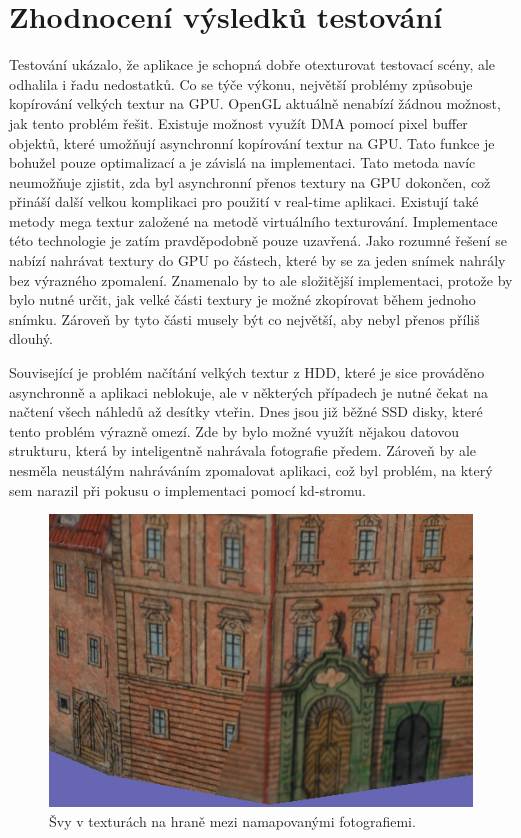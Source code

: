 \documentclass[11pt,twoside,a4paper]{book}
\begin{document}
\section{Zhodnocení výsledků testování}

Testování ukázalo, že aplikace je schopná dobře otexturovat testovací scény, ale odhalila i řadu nedostatků. Co se týče výkonu, největší problémy způsobuje kopírování velkých textur na GPU. OpenGL aktuálně nenabízí žádnou možnost, jak tento problém řešit. Existuje možnost využít DMA pomocí pixel buffer objektů, které umožňují asynchronní kopírování textur na GPU. Tato funkce je bohužel pouze optimalizací a je závislá na implementaci. Tato metoda navíc neumožňuje zjistit, zda byl asynchronní přenos textury na GPU dokončen, což přináší další velkou komplikaci pro použití v real-time aplikaci. Existují také metody mega textur \cite{mega} založené na metodě virtuálního texturování. Implementace této technologie je zatím pravděpodobně pouze uzavřená. Jako rozumné řešení se nabízí nahrávat textury do GPU po částech, které by se za jeden snímek nahrály bez výrazného zpomalení. Znamenalo by to ale složitější implementaci, protože by bylo nutné určit, jak velké části textury je možné zkopírovat během jednoho snímku. Zároveň by tyto části musely být co největší, aby nebyl přenos příliš dlouhý.

Související je problém načítání velkých textur z HDD, které je sice prováděno asynchronně a aplikaci neblokuje, ale v některých případech je nutné čekat na načtení všech náhledů až desítky vteřin. Dnes jsou již běžné SSD disky, které tento problém výrazně omezí. Zde by bylo možné využít nějakou datovou strukturu, která by inteligentně nahrávala fotografie předem. Zároveň by ale nesměla neustálým nahráváním zpomalovat aplikaci, což byl problém, na který sem narazil při pokusu o implementaci pomocí kd-stromu.

\begin{figure}[h!]
\begin{center}
\includegraphics{figures/err-1}
\caption{Švy v texturách na hraně mezi namapovanými fotografiemi.}
\label{fig:err-1}
\end{center}
\end{figure}
\end{document}
